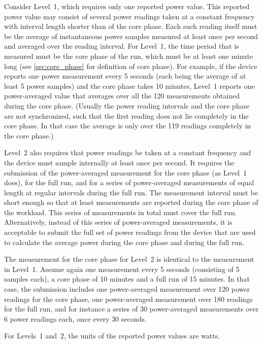 Consider Level~1, which requires only one reported power value.
This reported power value may consist of several power readings taken at a constant frequency with interval length shorter than \MaxReadingIntervalCorePhaseLTwoThree{} of the core phase.
Each such reading itself must be the average of instantaneous power samples measured at least once per second and averaged over the reading interval.
For Level~1, the time period that is measured must be the core phase of the run, which must be at least one minute long (see \ref{sec:core_phase} for definition of core phase).
For example, if the device reports one power measurement every 5 seconds (each being the average of at least 5 power samples) and the core phase takes 10 minutes, Level~1 reports one power-averaged value that averages over all the 120 measurements obtained during the core phase.
(Usually the power reading intervals and the core phase are not synchronized, such that the first reading does not lie completely in the core phase.
In that case the average is only over the 119 readings completely in the core phase.)

Level~2 also requires that power readings be taken at a constant frequency and the device must sample internally at least once per second.
It requires the submission of the power-averaged measurement for the core phase (as Level~1 does), for the full run, and for a series of power-averaged measurements of equal length at regular intervals during the full run.
The measurement interval must be short enough so that at least \MinMeasurementsCorePhaseLTwoThree{} measurements are reported during the core phase of the workload.
This series of measurements in total must cover the full run.
Alternatively, instead of this series of power-averaged measurements, it is acceptable to submit the full set of power readings from the device that are used to calculate the average power during the core phase and during the full run.

The measurement for the core phase for Level~2 is identical to the measurement in Level~1.
Assume again one measurement every 5 seconds (consisting of 5 samples each), a core phase of 10 minutes and a full run of 15 minutes.
In that case, the submission includes one power-averaged measurement over 120 power readings for the core phase, one power-averaged measurement over 180 readings for the full run, and for instance a series of 30 power-averaged measurements over 6 power readings each, once every 30 seconds.

For Levels~1 and~2, the units of the reported power values are watts.

